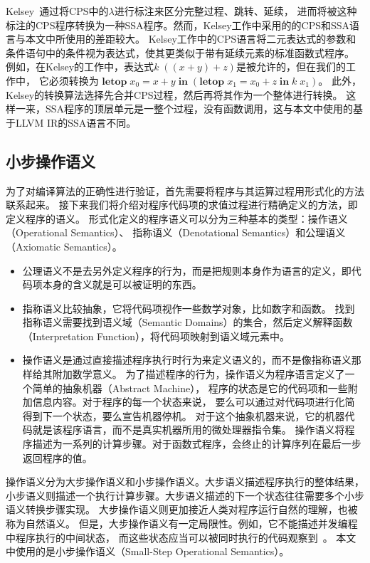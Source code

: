 Kelsey~\cite{kelsey1995correspondence}通过将CPS中的$\lambda$进行标注来区分完整过程、跳转、延续，
进而将被这种标注的CPS程序转换为一种SSA程序。然而，Kelsey工作中采用的的CPS和SSA语言与本文中所使用的差距较大。
Kelsey工作中的CPS语言将二元表达式的参数和条件语句中的条件视为表达式，使其更类似于带有延续元素的标准函数式程序。
例如，在Kelsey的工作中，表达式$k\; ((x+y)+z)$是被允许的，但在我们的工作中，
它必须转换为
$\mathbf{letop}\; x_0 = x+y\; \mathbf{in}\; (\mathbf{letop}\; x_1 = x_0+z\; \mathbf{in}\; k\; x_1)$。
此外，Kelsey的转换算法选择先合并CPS过程，然后再将其作为一个整体进行转换。
这样一来，SSA程序的顶层单元是一整个过程，没有函数调用，这与本文中使用的基于LLVM IR的SSA语言不同。

\subsection{小步操作语义} \label{sec:smallop}

为了对编译算法的正确性进行验证，首先需要将程序与其运算过程用形式化的方法联系起来。
接下来我们将介绍对程序代码项的求值过程进行精确定义的方法，即定义程序的语义。
形式化定义的程序语义可以分为三种基本的类型：操作语义（Operational Semantics）、
指称语义（Denotational Semantics）和公理语义（Axiomatic Semantics）\cite{pierce2002types}。

\begin{itemize}
    \item 公理语义不是去另外定义程序的行为，而是把规则本身作为语言的定义，即代码项本身的含义就是可以被证明的东西。
    \item 指称语义比较抽象，它将代码项视作一些数学对象，比如数字和函数。
    找到指称语义需要找到语义域（Semantic Domains）的集合，然后定义解释函数
    （Interpretation Function），将代码项映射到语义域元素中。
    \item 操作语义是通过直接描述程序执行时行为来定义语义的，而不是像指称语义那样给其附加数学意义。
    为了描述程序的行为，操作语义为程序语言定义了一个简单的抽象机器（Abstract Machine），
    程序的状态是它的代码项和一些附加信息内容。对于程序的每一个状态来说，
    要么可以通过对代码项进行化简得到下一个状态，要么宣告机器停机。
    对于这个抽象机器来说，它的机器代码就是该程序语言，而不是真实机器所用的微处理器指令集。
    操作语义将程序描述为一系列的计算步骤。对于函数式程序，会终止的计算序列在最后一步返回程序的值。
\end{itemize}

操作语义分为大步操作语义和小步操作语义。大步语义描述程序执行的整体结果，
小步语义则描述一个执行计算步骤。大步语义描述的下一个状态往往需要多个小步语义转换步骤实现。
大步操作语义则更加接近人类对程序运行自然的理解，也被称为自然语义。
但是，大步操作语义有一定局限性。例如，它不能描述并发编程中程序执行的中间状态，
而这些状态应当可以被同时执行的代码观察到~\cite{pierce2010software}。
本文中使用的是小步操作语义（Small-Step Operational Semantics）。

